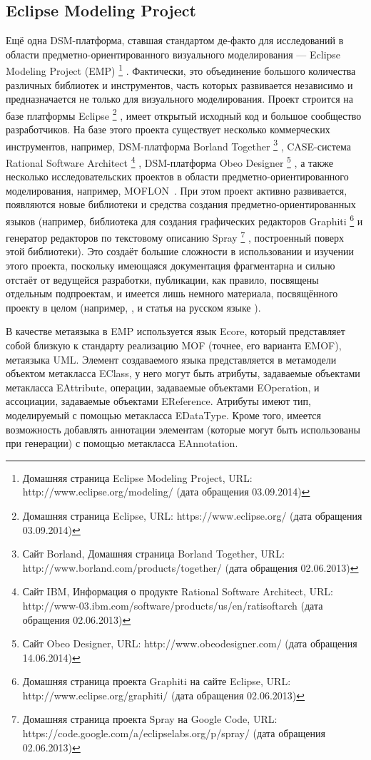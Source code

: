 \subsection{Eclipse Modeling Project}
Ещё одна DSM-платформа, ставшая стандартом де-факто для исследований в области предметно-ориентированного визуального моделирования --- 
Eclipse Modeling Project (EMP)%
\footnote{Домашняя страница Eclipse Modeling Project, URL: http://www.eclipse.org/modeling/ (дата обращения 03.09.2014)}%
. Фактически, это объединение большого количества различных библиотек и инструментов, часть которых развивается 
независимо и предназначается не только для визуального моделирования. Проект строится на базе платформы Eclipse%
\footnote{Домашняя страница Eclipse, URL: https://www.eclipse.org/ (дата обращения 03.09.2014)}%
, имеет открытый исходный код и большое сообщество разработчиков. На базе этого 
проекта существует несколько коммерческих инструментов, например, DSM-платформа Borland Together%
\footnote{Сайт Borland, Домашняя страница Borland Together, URL: http://www.borland.com/products/together/ (дата обращения 02.06.2013)}%
, CASE-система Rational Software Architect%
\footnote{Сайт IBM, Информация о продукте Rational Software Architect, 
URL: http://www-03.ibm.com/software/products/us/en/ratisoftarch (дата обращения 02.06.2013)}%
, DSM-платформа Obeo Designer%
\footnote{Сайт Obeo Designer, URL: http://www.obeodesigner.com/ (дата обращения 14.06.2014)}%
, а также несколько исследовательских проектов в области предметно-ориентированного моделирования, например, 
MOFLON~\cite{amelunxen2008metamodel}. При этом проект активно развивается, появляются 
новые библиотеки и средства создания предметно-ориентированных языков (например, библиотека для создания графических редакторов Graphiti%
\footnote{Домашняя страница проекта Graphiti на сайте Eclipse, URL: http://www.eclipse.org/graphiti/ (дата обращения 02.06.2013)}
и генератор редакторов по текстовому описанию Spray
\footnote{Домашняя страница проекта Spray на Google Code, URL: https://code.google.com/a/eclipselabs.org/p/spray/ (дата обращения 02.06.2013)}%
, построенный поверх этой библиотеки). Это создаёт большие сложности в использовании и изучении этого проекта, поскольку имеющаяся документация 
фрагментарна и сильно отстаёт от ведущейся разработки, публикации, как правило, посвящены 
отдельным подпроектам, и имеется лишь немного материала, посвящённого проекту в целом 
(например, \cite{gronback2009eclipse}, и статья на русском языке \cite{sorokin2010obzor}).

В качестве метаязыка в EMP используется язык Ecore, который представляет собой близкую 
к стандарту реализацию MOF (точнее, его варианта EMOF), метаязыка UML. Элемент создаваемого 
языка представляется в метамодели объектом метакласса EClass, у него могут быть атрибуты, 
задаваемые объектами метакласса EAttribute, операции, задаваемые объектами EOperation, и 
ассоциации, задаваемые объектами EReference. Атрибуты имеют тип, моделируемый с помощью 
метакласса EDataType. Кроме того, имеется возможность добавлять аннотации элементам 
(которые могут быть использованы при генерации) с помощью метакласса EAnnotation.

